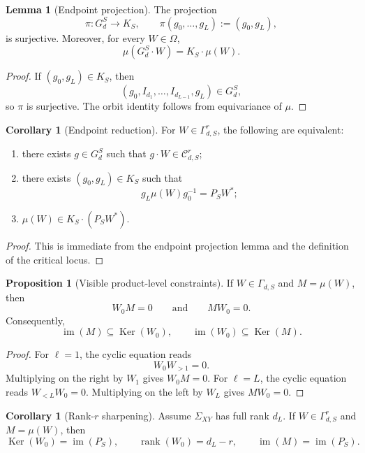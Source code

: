 \documentclass[11pt]{article}
\newcommand{\rk}{\operatorname{rank}}
\newcommand{\im}{\operatorname{im}}
\newcommand{\Ker}{\operatorname{Ker}}
\theoremstyle{definition}
\newtheorem{proposition}[theorem]{Proposition}
\newtheorem{lemma}[theorem]{Lemma}
\newtheorem{corollary}[theorem]{Corollary}
\begin{document}
\begin{lemma}[Endpoint projection]
The projection
\[
\pi:G_d^{S}\to K_S,
\qquad
\pi(g_0,\dots,g_L):=(g_0,g_L),
\]
is surjective. Moreover, for every \(W\in \Omega\),
\[
\mu(G_d^{S}\cdot W)=K_S\cdot \mu(W).
\]
\end{lemma}

\begin{proof}
If \((g_0,g_L)\in K_S\), then
\[
(g_0,I_{d_1},\dots,I_{d_{L-1}},g_L)\in G_d^{S},
\]
so \(\pi\) is surjective. The orbit identity follows from equivariance of
\(\mu\).
\end{proof}

\begin{corollary}[Endpoint reduction]
For \(W\in \Gamma_{d,S}^r\), the following are equivalent:
\begin{enumerate}
\item there exists \(g\in G_d^{S}\) such that \(g\cdot W\in \mathcal C_{d,S}^r\);
\item there exists \((g_0,g_L)\in K_S\) such that
  \[
  g_L\mu(W)g_0^{-1}=P_SW^\ast;
  \]
\item \(\mu(W)\in K_S\cdot(P_SW^\ast)\).
\end{enumerate}
\end{corollary}

\begin{proof}
This is immediate from the endpoint projection lemma and the definition of the
critical locus.
\end{proof}

\begin{proposition}[Visible product-level constraints]
If \(W\in \Gamma_{d,S}\) and \(M=\mu(W)\), then
\[
W_0M=0
\qquad\text{and}\qquad
MW_0=0.
\]
Consequently,
\[
\im(M)\subseteq \Ker(W_0),
\qquad
\im(W_0)\subseteq \Ker(M).
\]
\end{proposition}

\begin{proof}
For \(\ell=1\), the cyclic equation reads
\[
W_0W_{>1}=0.
\]
Multiplying on the right by \(W_1\) gives \(W_0M=0\). For \(\ell=L\), the cyclic
equation reads \(W_{<L}W_0=0\). Multiplying on the left by \(W_L\) gives
\(MW_0=0\).
\end{proof}

\begin{corollary}[Rank-\(r\) sharpening]
Assume \(\Sigma_{XY}\) has full rank \(d_L\). If \(W\in \Gamma_{d,S}^r\) and
\(M=\mu(W)\), then
\[
\Ker(W_0)=\im(P_S),
\qquad
\rk(W_0)=d_L-r,
\qquad
\im(M)=\im(P_S).
\]
\end{corollary}
\end{document}
